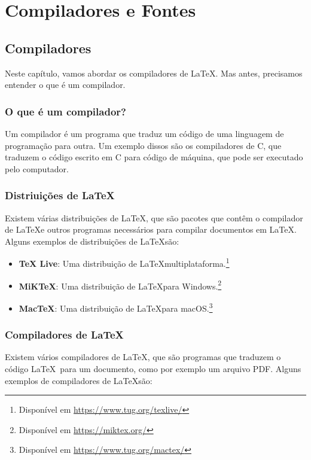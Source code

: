 \chapter{Compiladores e Fontes}

\section{Compiladores}

Neste capítulo, vamos abordar os compiladores de \LaTeX. Mas antes, precisamos entender o que é um compilador.

\subsection{O que é um compilador?}

Um compilador é um programa que traduz um código de uma linguagem de programação para outra. Um exemplo dissos são os compiladores de C, que traduzem o código escrito em C para código de máquina, que pode ser executado pelo computador.

\subsection{Distriuições de \LaTeX}

Existem várias distribuições de \LaTeX, que são pacotes que contêm o compilador de \LaTeX e outros programas necessários para compilar documentos em \LaTeX. Alguns exemplos de distribuições de \LaTeX são:

\begin{itemize}
	\item \textbf{TeX Live}: Uma distribuição de \LaTeX multiplataforma.\footnote{Disponível em \url{https://www.tug.org/texlive/}}
	\item \textbf{MiKTeX}: Uma distribuição de \LaTeX para Windows.\footnote{Disponível em \url{https://miktex.org/}}
	\item \textbf{MacTeX}: Uma distribuição de \LaTeX para macOS.\footnote{Disponível em \url{https://www.tug.org/mactex/}}
\end{itemize}

\subsection{Compiladores de \LaTeX}

Existem vários compiladores de \LaTeX, que são programas que traduzem o código \LaTeX\ para um documento, como por exemplo um arquivo PDF. Alguns exemplos de compiladores de \LaTeX são:

